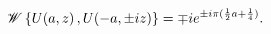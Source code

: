 \[\mathop{\mathscr{W}\/}\nolimits\left\{\mathop{U\/}\nolimits\!\left(a,z\right),%
\mathop{U\/}\nolimits\!\left(-a,\pm iz\right)\right\}=\mp ie^{\pm i\pi(\frac{1%
}{2}a+\frac{1}{4})}.\]